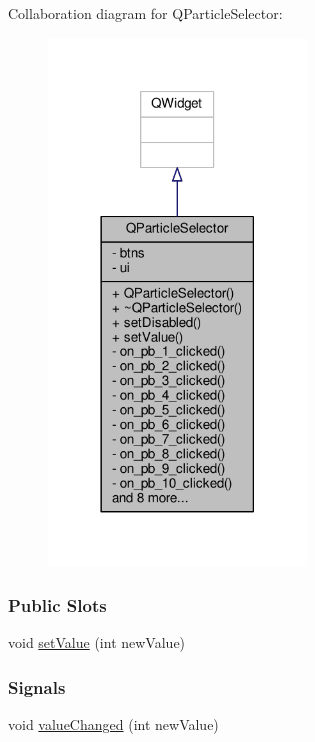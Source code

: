 Collaboration diagram for Q\+Particle\+Selector\+:
\nopagebreak
\begin{figure}[H]
\begin{center}
\leavevmode
\includegraphics[width=194pt]{class_q_particle_selector__coll__graph}
\end{center}
\end{figure}
\subsubsection*{Public Slots}
\begin{DoxyCompactItemize}
\item 
void \hyperlink{class_q_particle_selector_a023ce0a57b716e2d1613a90bd4f81c5d}{set\+Value} (int new\+Value)
\end{DoxyCompactItemize}
\subsubsection*{Signals}
\begin{DoxyCompactItemize}
\item 
void \hyperlink{class_q_particle_selector_ac9562cf3ebd13e54ff69ac6cd5e53c6d}{value\+Changed} (int new\+Value)
\end{DoxyCompactItemize}
